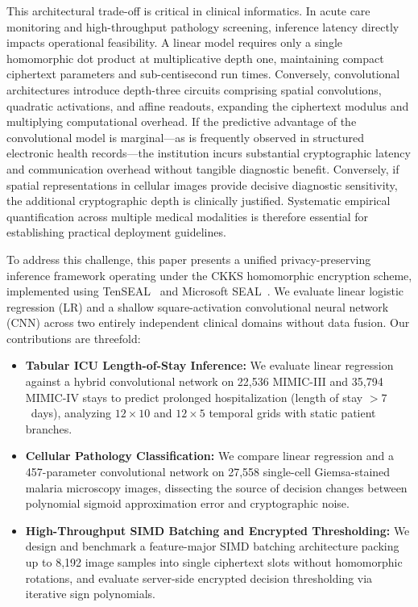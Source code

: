 \documentclass[conference]{IEEEtran}
\begin{document}
This architectural trade-off is critical in clinical informatics. In acute care monitoring and high-throughput pathology screening, inference latency directly impacts operational feasibility. A linear model requires only a single homomorphic dot product at multiplicative depth one, maintaining compact ciphertext parameters and sub-centisecond run times. Conversely, convolutional architectures introduce depth-three circuits comprising spatial convolutions, quadratic activations, and affine readouts, expanding the ciphertext modulus and multiplying computational overhead. If the predictive advantage of the convolutional model is marginal---as is frequently observed in structured electronic health records---the institution incurs substantial cryptographic latency and communication overhead without tangible diagnostic benefit. Conversely, if spatial representations in cellular images provide decisive diagnostic sensitivity, the additional cryptographic depth is clinically justified. Systematic empirical quantification across multiple medical modalities is therefore essential for establishing practical deployment guidelines.

To address this challenge, this paper presents a unified privacy-preserving inference framework operating under the CKKS homomorphic encryption scheme, implemented using TenSEAL~\cite{tenseal2021} and Microsoft SEAL~\cite{seal2020}. We evaluate linear logistic regression (LR) and a shallow square-activation convolutional neural network (CNN) across two entirely independent clinical domains without data fusion. Our contributions are threefold:
\begin{itemize}
    \item \textbf{Tabular ICU Length-of-Stay Inference:} We evaluate linear regression against a hybrid convolutional network on 22,536 MIMIC-III and 35,794 MIMIC-IV stays to predict prolonged hospitalization (length of stay $> 7$~days), analyzing $12 \times 10$ and $12 \times 5$ temporal grids with static patient branches.
    \item \textbf{Cellular Pathology Classification:} We compare linear regression and a 457-parameter convolutional network on 27,558 single-cell Giemsa-stained malaria microscopy images, dissecting the source of decision changes between polynomial sigmoid approximation error and cryptographic noise.
    \item \textbf{High-Throughput SIMD Batching and Encrypted Thresholding:} We design and benchmark a feature-major SIMD batching architecture packing up to 8,192 image samples into single ciphertext slots without homomorphic rotations, and evaluate server-side encrypted decision thresholding via iterative sign polynomials.
\end{itemize}
\end{document}
